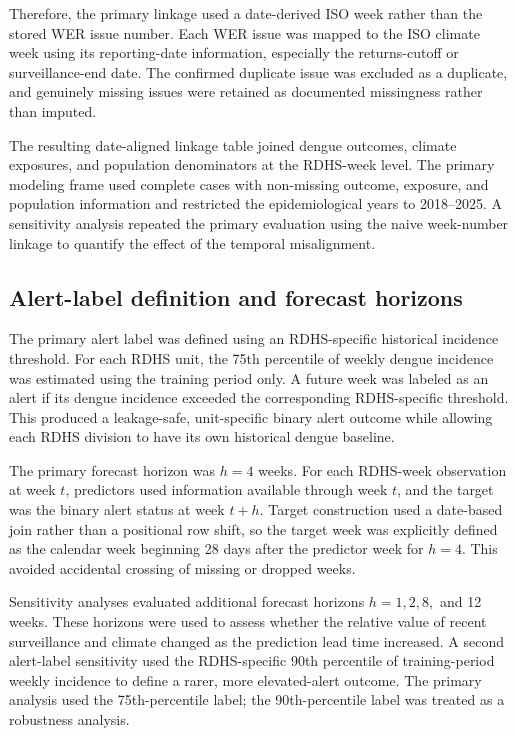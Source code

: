 \documentclass[11pt,a4paper]{article}
\begin{document}
Therefore, the primary linkage used a date-derived ISO week rather than the stored WER issue number. Each WER issue was mapped to the ISO climate week using its reporting-date information, especially the returns-cutoff or surveillance-end date. The confirmed duplicate issue was excluded as a duplicate, and genuinely missing issues were retained as documented missingness rather than imputed.

The resulting date-aligned linkage table joined dengue outcomes, climate exposures, and population denominators at the RDHS-week level. The primary modeling frame used complete cases with non-missing outcome, exposure, and population information and restricted the epidemiological years to 2018--2025. A sensitivity analysis repeated the primary evaluation using the naive week-number linkage to quantify the effect of the temporal misalignment.




\subsection{Alert-label definition and forecast horizons}
\label{subsec:alert-labels}

The primary alert label was defined using an RDHS-specific historical incidence threshold. For each RDHS unit, the 75th percentile of weekly dengue incidence was estimated using the training period only. A future week was labeled as an alert if its dengue incidence exceeded the corresponding RDHS-specific threshold. This produced a leakage-safe, unit-specific binary alert outcome while allowing each RDHS division to have its own historical dengue baseline.

The primary forecast horizon was $h=4$ weeks. For each RDHS-week observation at week $t$, predictors used information available through week $t$, and the target was the binary alert status at week $t+h$. Target construction used a date-based join rather than a positional row shift, so the target week was explicitly defined as the calendar week beginning 28 days after the predictor week for $h=4$. This avoided accidental crossing of missing or dropped weeks.

Sensitivity analyses evaluated additional forecast horizons $h=1,2,8,$ and 12 weeks. These horizons were used to assess whether the relative value of recent surveillance and climate changed as the prediction lead time increased. A second alert-label sensitivity used the RDHS-specific 90th percentile of training-period weekly incidence to define a rarer, more elevated-alert outcome. The primary analysis used the 75th-percentile label; the 90th-percentile label was treated as a robustness analysis.
\end{document}
